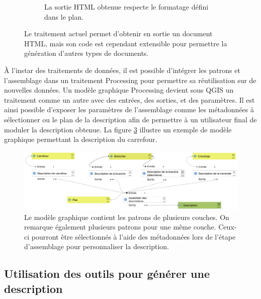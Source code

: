 \begin{figure}[ht]
\begin{subfigure}[t]{.49\linewidth}
        \caption{La sortie HTML obtenue respecte le formatage défini dans le plan.}
        \label{fig:experimentation_assemblage_html}
    \end{subfigure}
    \caption[Fenêtre QGIS de l'assemblage des descriptions]{Le traitement actuel permet d'obtenir en sortie un document HTML, mais son code est cependant extensible pour permettre la génération d'autres types de documents.}
    \label{fig:experimentation_assemblage}
\end{figure}

\newpar{}

À l'instar des traitements de données, il est possible d'intégrer les patrons et l'assemblage dans un traitement Processing pour permettre sa réutilisation sur de nouvelles données. Un modèle graphique Processing devient sous QGIS un traitement comme un autre avec des entrées, des sorties, et des paramètres. Il est ainsi possible d'exposer les paramètres de l'assemblage comme les métadonnées à sélectionner ou le plan de la description afin de permettre à un utilisateur final de moduler la description obtenue. La figure \ref{fig:experimentation_qgis2desc_modele_assemblage} illustre un exemple de modèle graphique permettant la description du carrefour.

\begin{figure}[ht]
    \centering
    \includegraphics[width=\textwidth]{images/experimentation/qgis2desc_modele_assemblage.png}
    \caption[Modèle graphique QGIS pour générer une description]{Le modèle graphique contient les patrons de plusieurs couches. On remarque également plusieurs patrons pour une même couche. Ceux-ci pourront être sélectionnés à l'aide des métadonnées lors de l'étape d'assemblage pour personnaliser la description.}
    \label{fig:experimentation_qgis2desc_modele_assemblage}
\end{figure}

\subsection{Utilisation des outils pour générer une description}

